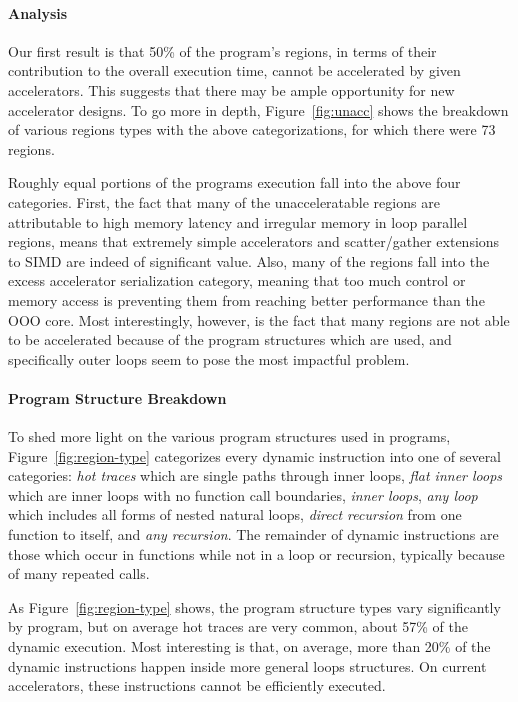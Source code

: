 \paragraph{Analysis}  Our first result is that
50\% of the program's regions, in terms of their contribution to
the overall execution time, cannot be accelerated by given accelerators.
This suggests that there may be ample opportunity for new accelerator designs.  To go
more in depth, Figure~\ref{fig:unacc} shows the breakdown of various regions types
with the above categorizations, for which there were 73 regions.

Roughly equal portions of the programs execution fall
into the above four categories.  First, the fact that many of the unacceleratable 
regions are attributable to high memory latency and irregular memory in loop parallel
regions, means that extremely simple accelerators and scatter/gather extensions to
SIMD are indeed of significant value.  Also, many of the regions fall
into the excess accelerator serialization category, meaning that too much control
or memory access is preventing them from reaching better performance than the OOO core.
Most interestingly, however, is the fact that many regions are not able to be
accelerated because of the program structures which are used, and specifically outer
loops seem to pose the most impactful problem.

\paragraph{Program Structure Breakdown}
To shed more light on the various program structures used in programs, 
Figure~\ref{fig:region-type} categorizes every dynamic instruction
into one of several categories: \emph{hot traces} which are single
paths through inner loops, \emph{flat inner loops} which are inner loops with no function
call boundaries, \emph{inner loops}, \emph{any loop} which includes all forms of nested
natural loops, \emph{direct recursion} from one function to itself, and \emph{any recursion}.  The remainder of dynamic instructions are those which occur in functions while
not in a loop or recursion, typically because of many repeated calls.

As Figure~\ref{fig:region-type} shows, the program structure types vary
significantly by program, but on average hot traces are very common, about 57\%
of the dynamic execution.  Most interesting is that, on average, more than 20\% of the
dynamic instructions happen inside more general loops structures.  On current
accelerators, these instructions cannot be efficiently executed.

